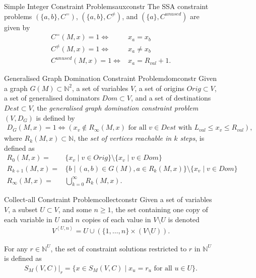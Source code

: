 \begin{figure}[p]
    \begin{definition}{Simple Integer Constraint Problems}{auxconstr}
        The SSA constraint problems $(\{a,b\}, C^=)$, $(\{a,b\}, C^{\neq})$,
        and $(\{a\}, C^{unused})$ are given by
        \begin{align*}
        C^=(M,x)=1\iff{}&x_a=x_b\\[-0.73mm]
        C^{\neq}(M,x)=1\iff{}&x_a\neq x_b\\[-0.73mm]
        C^{unused}(M,x)=1\iff{}&x_a= R_{val}+1.
        \end{align*}
    \end{definition}
    \begin{definition}{Generalised Graph Domination Constraint Problem}{domconstr}
        Given a graph $G(M)\subset\mathbb N^2$, a set of variables $V$,
        a set of origins $Orig\subset V$,
        a set of generalised dominators $Dom\subset V$, and
        a set of destinations $Dest\subset V$, the
        {\em generalised graph domination constraint problem}
        $(V,D_G)$ is defined by
        \begin{align*}
            D_G(M,x)=1\iff(x_v\notin R_{\infty}(M,x)\text{ for all }v\in Dest\text{ with }L_{val}\leq x_v\leq R_{val}),
        \end{align*}
        where $R_k(M,x)\subset\mathbb N$, the {\it set of vertices reachable in $k$ steps},
        is defined as
        \begin{align*}
            R_0(M,x)={}&\{x_v\mid v\in Orig\}\setminus\{x_v\mid v\in Dom\}\\[-0.73mm]
            R_{k+1}(M,x)={}&\{b\mid (a,b)\in G(M),a\in R_k(M,x)\}\setminus\{x_v\mid v\in Dom\}\\[-0.73mm]
            R_\infty(M,x)={}&\textstyle\bigcup_{k=0}^\infty R_k(M,x).
        \end{align*}
    \end{definition}
    \begin{definition}{Collect-all Constraint Problem}{collectconstr}
        Given a set of variables $V$, a subset $U\subset V$, and some $n\geq1$,
        the set containing one copy of each variable in $U$ and $n$ copies of
        each value in $V\setminus U$ is denoted
        \begin{align*}
            V^{\left<U,n\right>}=U\cup(\{1,\dots,n\}\times (V\setminus U)).
        \end{align*}

        For any $r\in\mathbb N^U$, the set of constraint solutions restricted to
        $r$ in $\mathbb N^U$ is defined as
        \begin{align*}
            S_M(V,C)|_{r}=\{x\in S_M(V,C)\mid x_u=r_u\text{ for all }u\in U\}.
        \end{align*}


\end{definition}
\end{figure}
